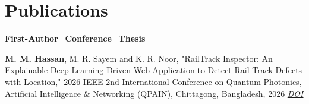 \documentclass[10pt]{article}
\makeatletter
\newcommand{\entry}[2]{%
  \noindent\begin{tabularx}{\linewidth}{@{}X r@{}}
    \textbf{#1} & \textit{\small #2}
  \end{tabularx}\vspace{-1pt}
}
\newcommand{\subentry}[2]{%
  \noindent\begin{tabularx}{\linewidth}{@{}X r@{}}
    \textit{\small #1} & {\small #2}
  \end{tabularx}\vspace{1pt}
}
\makeatother
\begin{document}

\section{Publications}
\vspace{2pt}
{\small
    \textbf{First-Author} \textbar\ 
    \textbf{Conference} \textbar\ 
    \textbf{Thesis}
}
\vspace{2pt}
\begin{enumerate}[leftmargin=18pt, itemsep=2pt, topsep=2pt, label={[\arabic*]}]
\item \textbf{M. M. Hassan}, M. R. Sayem and K. R. Noor, "RailTrack Inspector: An Explainable Deep Learning Driven Web Application to Detect Rail Track Defects with Location," 2026 IEEE 2nd International Conference on Quantum Photonics, Artificial Intelligence \& Networking (QPAIN), Chittagong, Bangladesh, 2026 \textit{\href{https://doi.org/10.1109/QPAIN69676.2026.11546344}{DOI}}
\end{enumerate}



\end{document}
